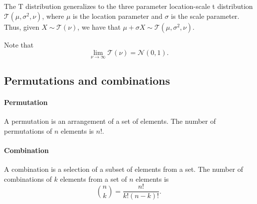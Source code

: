 
The T distribution generalizes to the three parameter location-scale t distribution
$\mathcal{T}(\mu, \sigma^2, \nu)$, where $\mu$ is the location parameter and $\sigma$ is
the scale parameter.  Thus, given $X \sim \mathcal{T}(\nu)$, we have that
$\mu + \sigma X \sim \mathcal{T}(\mu, \sigma^2, \nu)$.

Note that $$\lim_{\nu \rightarrow \infty} \mathcal{T}(\nu) = \mathcal{N}(0, 1)\text{.}$$

\subsection{Permutations and combinations}

\paragraph{Permutation}  A permutation is an arrangement of a set of elements.  The
number of permutations of $n$ elements is $n!$.

\paragraph{Combination}  A combination is a selection of a subset of elements from a
set.  The number of combinations of $k$ elements from a set of $n$ elements is
$$\binom{n}{k} = \frac{n!}{k!(n - k)!}\text{.}$$

